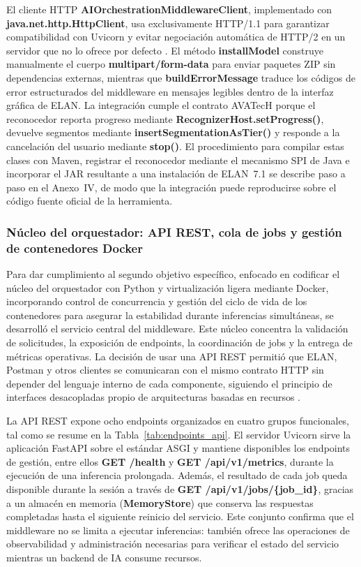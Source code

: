El cliente HTTP \textbf{AIOrchestration\allowbreak{}MiddlewareClient}, implementado con \textbf{java.net.http.\allowbreak{}HttpClient}, usa exclusivamente HTTP/1.1 para garantizar compatibilidad con Uvicorn y evitar negociación automática de HTTP/2 en un servidor que no lo ofrece por defecto \cite{java11_httpclient,uvicorn_docs}. El método \textbf{installModel} construye manualmente el cuerpo \textbf{multipart/form-data} para enviar paquetes ZIP sin dependencias externas, mientras que \textbf{buildErrorMessage} traduce los códigos de error estructurados del middleware en mensajes legibles dentro de la interfaz gráfica de ELAN. La integración cumple el contrato AVATecH porque el reconocedor reporta progreso mediante \textbf{RecognizerHost.\allowbreak{}setProgress()}, devuelve segmentos mediante \textbf{insertSegmentation\allowbreak{}AsTier()} y responde a la cancelación del usuario mediante \textbf{stop()}. El procedimiento para compilar estas clases con Maven, registrar el reconocedor mediante el mecanismo SPI de Java e incorporar el JAR resultante a una instalación de ELAN~7.1 se describe paso a paso en el Anexo~IV, de modo que la integración puede reproducirse sobre el código fuente oficial de la herramienta.

\subsubsection{Núcleo del orquestador: API REST, cola de jobs y gestión de contenedores Docker}

Para dar cumplimiento al segundo objetivo específico, enfocado en codificar el núcleo del orquestador con Python y virtualización ligera mediante Docker, incorporando control de concurrencia y gestión del ciclo de vida de los contenedores para asegurar la estabilidad durante inferencias simultáneas, se desarrolló el servicio central del middleware. Este núcleo concentra la validación de solicitudes, la exposición de endpoints, la coordinación de jobs y la entrega de métricas operativas. La decisión de usar una API REST permitió que ELAN, Postman y otros clientes se comunicaran con el mismo contrato HTTP sin depender del lenguaje interno de cada componente, siguiendo el principio de interfaces desacopladas propio de arquitecturas basadas en recursos \cite{fielding2000rest,fastapi2026features}.

La API REST expone ocho endpoints organizados en cuatro grupos funcionales, tal como se resume en la Tabla~\ref{tab:endpoints_api}. El servidor Uvicorn sirve la aplicación FastAPI sobre el estándar ASGI y mantiene disponibles los endpoints de gestión, entre ellos \textbf{GET /health} y \textbf{GET /api/v1/metrics}, durante la ejecución de una inferencia prolongada. Además, el resultado de cada job queda disponible durante la sesión a través de \textbf{GET /api/v1/jobs/\{job\_id\}}, gracias a un almacén en memoria (\textbf{MemoryStore}) que conserva las respuestas completadas hasta el siguiente reinicio del servicio. Este conjunto confirma que el middleware no se limita a ejecutar inferencias: también ofrece las operaciones de observabilidad y administración necesarias para verificar el estado del servicio mientras un backend de IA consume recursos.

